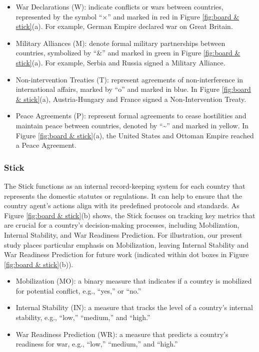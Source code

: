 \documentclass{article}
\newcommand{\lizhou}[1]{{\small\color{magenta}{\bf Lizhou: #1}}}
\newcommand{\lingyao}[1]{{\small\color{green}{\bf Lingyao: #1}}}
\begin{document}
\begin{itemize}
    \item War Declarations (W): indicate conflicts or wars between countries, represented by the symbol ``$\times$'' and marked in red in Figure \ref{fig:board & stick}(a). For example, German Empire declared war on Great Britain. 
    \item Military Alliances (M): denote formal military partnerships between countries, symbolized by ``\&'' and marked in green in Figure \ref{fig:board & stick}(a). For example, Serbia and Russia signed a Military Alliance. 
    \item Non-intervention Treaties (T): represent agreements of non-interference in international affairs, marked by ``o'' and marked in blue. In Figure \ref{fig:board & stick}(a), Austria-Hungary and France signed a Non-Intervention Treaty. 
    \item Peace Agreements (P): represent formal agreements to cease hostilities and maintain peace between countries, denoted by ``\textasciitilde'' and marked in yellow. In Figure \ref{fig:board & stick}(a), the United States and Ottoman Empire reached a Peace Agreement.
\end{itemize}



\subsubsection{Stick}
The Stick functions as an internal record-keeping system for each country that represents the domestic statutes or regulations. It can help to ensure that the country agent's actions align with its predefined protocols and standards. As Figure \ref{fig:board & stick}(b) shows, the Stick focuses on tracking key metrics that are crucial for a country's decision-making processes, including Mobilization, Internal Stability, and War Readiness Prediction. For illustration, our present study places particular emphasis on Mobilization, leaving Internal Stability and War Readiness Prediction for future work (indicated within dot boxes in Figure \ref{fig:board & stick}(b)). 

\begin{itemize}
    \item Mobilization (MO): a binary measure that indicates if a country is mobilized for potential conflict, e.g., ``yes,'' or ``no.''
    \item Internal Stability (IN): a measure that tracks the level of a country's internal stability, e.g., ``low,'' ``medium,'' and ``high.''
    \item War Readiness Prediction (WR): a measure that predicts a country's readiness for war, e.g., ``low,'' ``medium,'' and ``high.''
\end{itemize}
\end{document}

